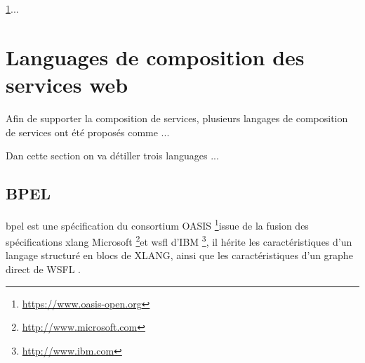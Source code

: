 


      \ref{sec:lang-de-comp}...
      \newpage

  \section{Languages de composition des services web}
  \label{sec:lang-de-comp}
  Afin de supporter la composition de services, plusieurs langages de
  composition de services ont été proposés comme ...

  Dan cette section on va détiller trois languages ...

    \subsection{BPEL}
    \label{sec:bpel}

    \acrshort{bpel} est une spécification du consortium OASIS
    \footnote{\url{https://www.oasis-open.org}}issue de la fusion des
    spécifications \acrshort{xlang} Microsoft
    \footnote{\url{http://www.microsoft.com}}et \acrshort{wsfl} d'IBM
    \footnote{\url{http://www.ibm.com}}, il hérite les
    caractéristiques d'un langage structuré en blocs de
    \textsc{XLANG}, ainsi que les caractéristiques d'un graphe direct
    de WSFL \cite{driss2011approche}.

